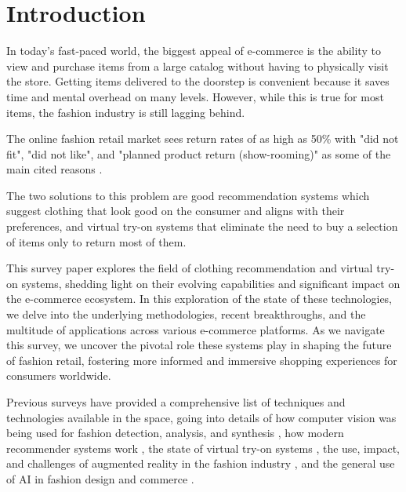 \section{Introduction} \label{section:intro}
	In today's fast-paced world, the biggest appeal of e-commerce is the ability to view and purchase items from a large catalog without having to physically visit the store. Getting items delivered to the doorstep is convenient because it saves time and mental overhead on many levels. However, while this is true for most items, the fashion industry is still lagging behind.

	The online fashion retail market sees return rates of as high as 50\% with "did not fit", "did not like", and "planned product return (show-rooming)" as some of the main cited reasons \cite{stocker2021new}.

	The two solutions to this problem are good recommendation systems which suggest clothing that look good on the consumer and aligns with their preferences, and virtual try-on systems that eliminate the need to buy a selection of items only to return most of them.

	This survey paper explores the field of clothing recommendation and virtual try-on systems, shedding light on their evolving capabilities and significant impact on the e-commerce ecosystem. In this exploration of the state of these technologies, we delve into the underlying methodologies, recent breakthroughs, and the multitude of applications across various e-commerce platforms. As we navigate this survey, we uncover the pivotal role these systems play in shaping the future of fashion retail, fostering more informed and immersive shopping experiences for consumers worldwide.

	Previous surveys have provided a comprehensive list of techniques and technologies available in the space, going into details of how computer vision was being used for fashion detection, analysis, and synthesis \cite{DBLP:journals/csur/ChengSCHL21, Jain_Wah_2022}, how modern recommender systems work \cite{DBLP:journals/corr/abs-2202-02757, DBLP:journals/sncs/ShirkhaniMSH23}, the state of virtual try-on systems \cite{DBLP:journals/corr/abs-2111-00905, DBLP:journals/mta/GhodhbaniNRA22, DBLP:journals/cvm/LiangL21}, the use, impact, and challenges of augmented reality in the fashion industry \cite{menon2020impact, jayamini2021use, DBLP:journals/corr/abs-2202-09450, huang2019enhancing, mehta2020enhancement, zak2020augmented, caboni2019augmented}, and the general use of AI in fashion design and commerce \cite{DBLP:journals/access/GiriJZB19, DBLP:journals/corr/abs-2105-03050, DBLP:journals/access/GuoZLCCW23, DBLP:journals/spm/ChenSC23, sahni2021review, liang2020implementation, sareen2022ai, 10153335, DBLP:journals/tmm/Yan0LZX0Y23}.

